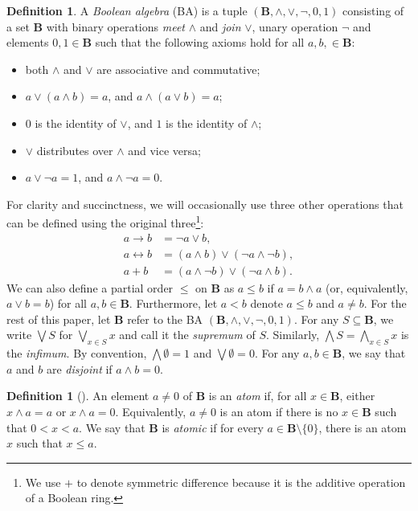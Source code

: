 \documentclass{article}
\theoremstyle{definition}
\newtheorem{definition}[theorem]{Definition}
\theoremstyle{remark}
\begin{document}
\begin{definition} \label{def:ba}
  A \emph{Boolean algebra} (BA) is a tuple $(\mathbf{B}, \land, \lor, \neg, 0,
  1)$ consisting of a set $\mathbf{B}$ with binary operations \emph{meet}
  $\land$ and \emph{join} $\lor$, unary operation $\neg$ and elements $0, 1 \in
  \mathbf{B}$ such that the following axioms hold for all $a, b, \in
  \mathbf{B}$:
  \begin{itemize}
  \item both $\land$ and $\lor$ are associative and commutative;
  \item $a \lor (a \land b) = a$, and $a \land (a \lor b) = a$;
  \item $0$ is the identity of $\lor$, and $1$ is the identity of $\land$;
  \item $\lor$ distributes over $\land$ and vice versa;
  \item $a \lor \neg a = 1$, and $a \land \neg a = 0$.
  \end{itemize}
\end{definition}

For clarity and succinctness, we will occasionally use three other operations
that can be defined using the original three\footnote{We use $+$ to denote
  symmetric difference because it is the additive operation of a Boolean ring.}:
\begin{align*}
  a \to b &= \neg a \lor b, \\
  a \leftrightarrow b &= (a \land b) \lor (\neg a \land \neg b), \\
  a + b &= (a \land \neg b) \lor (\neg a \land b).
\end{align*}
We can also define a partial order $\le$ on $\mathbf{B}$ as $a \le b$ if $a = b
\land a$ (or, equivalently, $a \lor b = b$) for all $a, b \in \mathbf{B}$.
Furthermore, let $a < b$ denote $a \le b$ and $a \ne b$. For the rest of this
paper, let $\mathbf{B}$ refer to the BA $(\mathbf{B}, \land, \lor, \neg, 0, 1)$.
For any $S \subseteq \mathbf{B}$, we write $\bigvee S$ for $\bigvee_{x \in S} x$
and call it the \emph{supremum} of $S$. Similarly, $\bigwedge S = \bigwedge_{x
  \in S} x$ is the \emph{infimum}. By convention, $\bigwedge \emptyset = 1$ and
$\bigvee \emptyset = 0$. For any $a, b \in \mathbf{B}$, we say that $a$ and $b$
are \emph{disjoint} if $a \land b = 0$.

\begin{definition}[\cite{DBLP:books/daglib/0090259,levasseur2012applied}]
  An element $a \ne 0$ of $\mathbf{B}$ is an \emph{atom} if, for all $x \in
  \mathbf{B}$, either $x \land a = a$ or $x \land a = 0$. Equivalently, $a \ne
  0$ is an atom if there is no $x \in \mathbf{B}$ such that $0 < x < a$. We say
  that $\mathbf{B}$ is \emph{atomic} if for every $a \in \mathbf{B} \setminus \{0
  \}$, there is an atom $x$ such that $x \le a$.
\end{definition}
\end{document}
